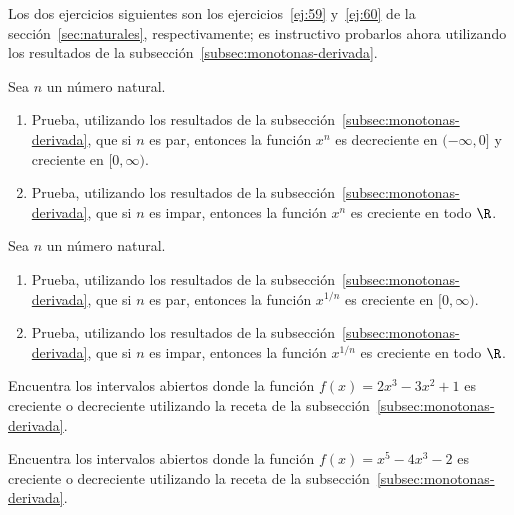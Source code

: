 \documentclass[12pt,a4paper]{book}
\begin{document}
    Los dos ejercicios siguientes son los ejercicios~\ref{ej:59} y~\ref{ej:60} de la sección~\ref{sec:naturales},
    respectivamente; es instructivo probarlos ahora utilizando los resultados de
    la subsección~\ref{subsec:monotonas-derivada}.

    \begin{ejercicio}\label{ej:271}
        Sea $n$ un número natural.
        \begin{enumerate}[nosep]
            \item Prueba, utilizando los resultados de la subsección~\ref{subsec:monotonas-derivada}, que si $n$ es par,
            entonces la función $x^{n}$ es decreciente en $(-\infty,0]$ y creciente en $[0,\infty)$.
            \item Prueba, utilizando los resultados de la subsección~\ref{subsec:monotonas-derivada}, que si $n$ es impar,
            entonces la función $x^{n}$ es creciente en todo $\R$.
        \end{enumerate}
    \end{ejercicio}

    \begin{ejercicio}\label{ej:272}
        Sea $n$ un número natural.
        \begin{enumerate}[nosep]
            \item Prueba, utilizando los resultados de la subsección~\ref{subsec:monotonas-derivada}, que si $n$ es par,
            entonces la función $x^{1/n}$ es creciente en $[0,\infty)$.
            \item Prueba, utilizando los resultados de la subsección~\ref{subsec:monotonas-derivada}, que si $n$ es impar,
            entonces la función $x^{1/n}$ es creciente en todo $\R$.
        \end{enumerate}
    \end{ejercicio}

    \begin{ejercicio}\label{ej:273}
        Encuentra los intervalos abiertos donde la función $f(x)=
        2x^{3}-3x^{2}+1$ es creciente o decreciente utilizando la receta de la subsección~\ref{subsec:monotonas-derivada}.
    \end{ejercicio}

    \begin{ejercicio}\label{ej:274}
        Encuentra los intervalos abiertos donde la función $f(x)=
        x^{5}-4x^{3}-2$ es creciente o decreciente utilizando la receta de la subsección~\ref{subsec:monotonas-derivada}.
    \end{ejercicio}
\end{document}
